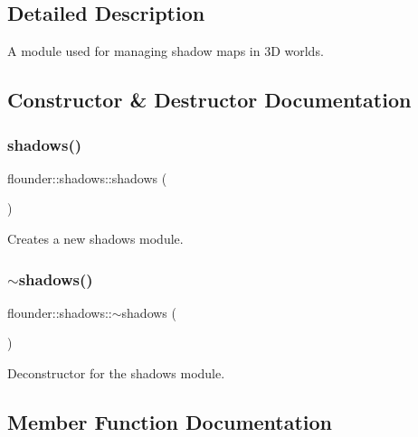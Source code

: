 \subsection{Detailed Description}
A module used for managing shadow maps in 3D worlds. 



\subsection{Constructor \& Destructor Documentation}
\mbox{\label{classflounder_1_1shadows_a64c5f1bbf92b5aefdc071a312c71e403}} 
\subsubsection{\texorpdfstring{shadows()}{shadows()}}
{\footnotesize\ttfamily flounder\+::shadows\+::shadows (\begin{DoxyParamCaption}{ }\end{DoxyParamCaption})}



Creates a new shadows module. 

\mbox{\label{classflounder_1_1shadows_a1d55b9d191411baa62296650798ebb5a}} 
\subsubsection{\texorpdfstring{$\sim$shadows()}{~shadows()}}
{\footnotesize\ttfamily flounder\+::shadows\+::$\sim$shadows (\begin{DoxyParamCaption}{ }\end{DoxyParamCaption})}



Deconstructor for the shadows module. 



\subsection{Member Function Documentation}
\mbox{\label{classflounder_1_1shadows_ac1c2ba5a154516b058183f3de8c1a374}} 
